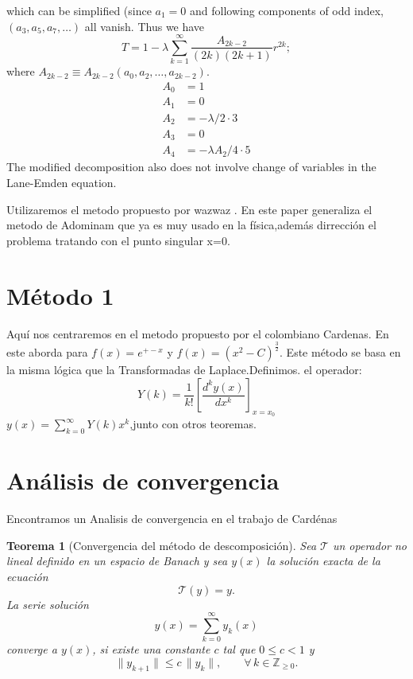 \documentclass{GEM-JNL-FMP}
\newtheorem{theorem}{Teorema}[section]
\theoremstyle{definition}
\numberwithin{equation}{section}
\begin{document}
which can be simplified (since $a_{1}=0$ and following components of odd index, $(a_{3},a_{5},a_{7},\dots)$ all vanish. Thus we have
\begin{equation}
T=1-\lambda\sum_{k=1}^{\infty}\frac{A_{2k-2}}{(2k)(2k+1)}r^{2k};
\end{equation}
where $A_{2k-2}\equiv A_{2k-2}(a_{0},a_{2},\dots,a_{2k-2}).$
\begin{align*}
A_{0}&=1 \\
A_{1}&=0 \\
A_{2}&=-\lambda/2\cdot3 \\
A_{3}&=0 \\
A_{4}&=-\lambda A_{2}/4\cdot5
\end{align*}
The modified decomposition also does not involve change of variables in the Lane-Emden equation.











Utilizaremos el metodo propuesto por wazwaz \cite{wazwaz} .
En este paper generaliza el metodo de Adominam que ya es muy usado en la física,además dirrección el problema tratando con el punto singular x=0.
\section{Método 1}
Aquí nos centraremos en el metodo propuesto por el colombiano Cardenas.
En este aborda para $f(x)=e^{+-x}$ y $f(x)=(x^2-C)^{\frac{3}{2}}$.
Este método se basa en la misma lógica que la Transformadas de Laplace.Definimos. el operador:
$$Y(k)=\frac{1}{k!}[\frac{d^ky(x)}{dx^k}]_{x=x_0}$$
$y(x)=\sum_{k=0}^{\infty}Y(k)x^k$,junto con otros teoremas.
\section{Análisis de convergencia}
Encontramos un Analisis de convergencia en el trabajo de Cardénas \cite{alzate2014}
\begin{theorem}[Convergencia del método de descomposición]
Sea $\mathcal{T}$ un operador no lineal definido en un espacio de Banach y sea $y(x)$ la solución exacta de la ecuación
\begin{equation}\label{eq:42}
\mathcal{T}(y) = y.
\end{equation}
La serie solución
\begin{equation}\label{eq:14}
y(x) = \sum_{k=0}^{\infty} y_k(x)
\end{equation}
converge a $y(x)$, si existe una constante $c$ tal que $0 \leq c < 1$ y
\[
\|y_{k+1}\| \leq c\,\|y_k\|, \qquad \forall\, k \in \mathbb{Z}_{\ge 0}.
\]
\end{theorem}
\end{document}
